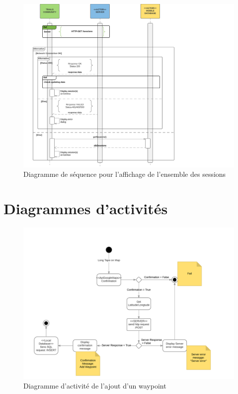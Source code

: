 \documentclass[titlepage, 12pt]{report}
\begin{document}
\begin{figure}[!h]
	\caption{Diagramme de séquence pour l'affichage de l'ensemble des sessions}
	\label{view_sessions_sequence_diagram}
	\centering
	\includegraphics[scale=0.7]{Images/diagram/view_sessions_sequence_diagram.png}
\end{figure}

\chapter{Diagrammes d'activités}

\begin{figure}[!h]
	\caption{Diagramme d'activité de l'ajout d'un waypoint}
	\label{add_waypoint_activity_diagram}
	\centering
	\includegraphics[scale=0.6]{Images/diagram/add_waypoint_activity_diagram.png}
\end{figure}
\end{document}
